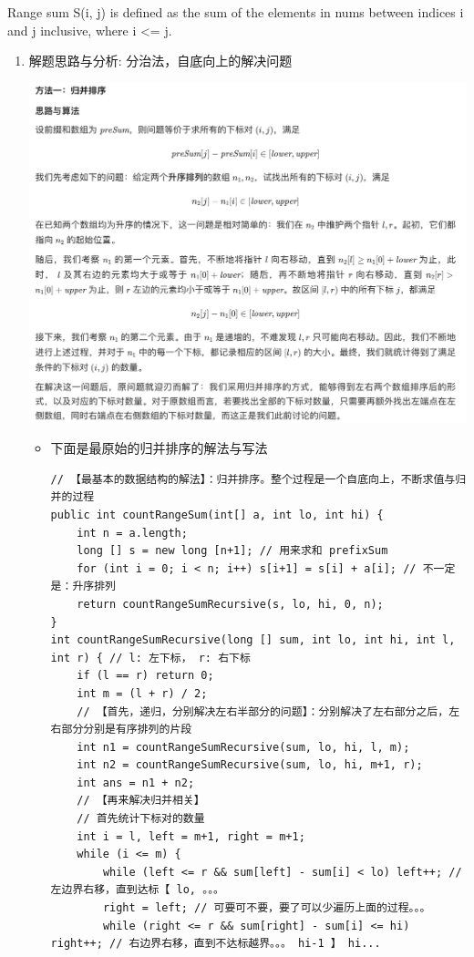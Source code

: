 \documentclass[9pt, b5paaper]{book}
\begin{document}
Range sum S(i, j) is defined as the sum of the elements in nums between indices i and j inclusive, where i <= j.
\begin{enumerate}
\item 解题思路与分析: 分治法，自底向上的解决问题
\label{sec-1-1-1-1}

\includegraphics[width=.9\linewidth]{./pic/segmentTree_20230414_095339.png}
\begin{itemize}
\item 下面是最原始的归并排序的解法与写法
\begin{verbatim}
// 【最基本的数据结构的解法】：归并排序。整个过程是一个自底向上，不断求值与归并的过程
public int countRangeSum(int[] a, int lo, int hi) {
    int n = a.length;
    long [] s = new long [n+1]; // 用来求和 prefixSum
    for (int i = 0; i < n; i++) s[i+1] = s[i] + a[i]; // 不一定是：升序排列 
    return countRangeSumRecursive(s, lo, hi, 0, n);
}
int countRangeSumRecursive(long [] sum, int lo, int hi, int l, int r) { // l: 左下标， r: 右下标
    if (l == r) return 0;
    int m = (l + r) / 2;
    // 【首先，递归，分别解决左右半部分的问题】：分别解决了左右部分之后，左右部分分别是有序排列的片段
    int n1 = countRangeSumRecursive(sum, lo, hi, l, m);
    int n2 = countRangeSumRecursive(sum, lo, hi, m+1, r);
    int ans = n1 + n2;
    // 【再来解决归并相关】
    // 首先统计下标对的数量
    int i = l, left = m+1, right = m+1;
    while (i <= m) {
        while (left <= r && sum[left] - sum[i] < lo) left++; // 左边界右移，直到达标【 lo, 。。。
        right = left; // 可要可不要，要了可以少遍历上面的过程。。。
        while (right <= r && sum[right] - sum[i] <= hi) right++; // 右边界右移，直到不达标越界。。。 hi-1 】 hi...

\end{verbatim}
\end{itemize}
\end{enumerate}
\end{document}
